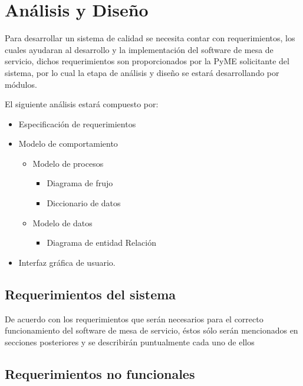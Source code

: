 \chapter{Análisis y Diseño}
Para desarrollar un sistema de calidad se necesita contar con requerimientos, los cuales ayudaran al desarrollo y la implementación del software de mesa de servicio, dichos requerimientos son  proporcionados por la PyME solicitante del sistema, por lo cual  la etapa de análisis y diseño se estará desarrollando por módulos. 

El siguiente análisis estará compuesto por:

\begin{itemize}
	\item Especificación de requerimientos 
	\item 	Modelo de comportamiento
	\begin{itemize}
		\item Modelo de procesos 
		\begin{itemize}
			\item	Diagrama de frujo 
			\item 	Diccionario de datos 
		\end{itemize}
	\item Modelo de datos
	\begin{itemize}
		\item Diagrama de entidad Relación
	\end{itemize}
	
	\end{itemize}
	
		\item Interfaz gráfica de usuario.
\end{itemize}





    \section{Requerimientos  del sistema}
 De acuerdo con los requerimientos que serán necesarios para el correcto funcionamiento del software de mesa de servicio, éstos sólo serán mencionados en secciones posteriores y  se describirán puntualmente cada uno de ellos

\section{Requerimientos no funcionales}


